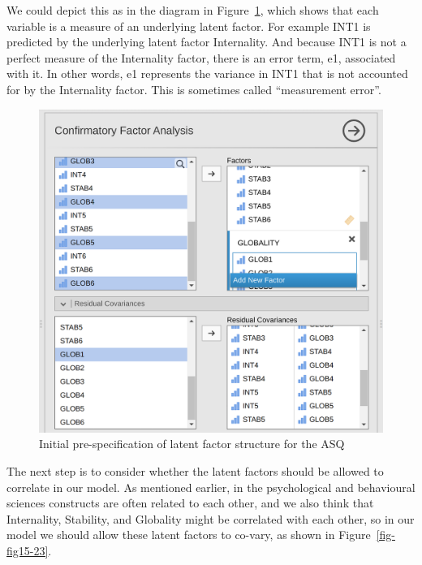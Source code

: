 \documentclass[
  a4paper,
]{book}
\begin{document}
We could depict this as in the diagram in Figure~\ref{fig-fig15-22},
which shows that each variable is a measure of an underlying latent
factor. For example INT1 is predicted by the underlying latent factor
Internality. And because INT1 is not a perfect measure of the
Internality factor, there is an error term, e1, associated with it. In
other words, e1 represents the variance in INT1 that is not accounted
for by the Internality factor. This is sometimes called ``measurement
error''.

\begin{figure}

\includegraphics[width=1\textwidth,height=\textheight]{images/fig15-22.png} \hfill{}

\caption{\label{fig-fig15-22}Initial pre-specification of latent factor
structure for the ASQ}

\end{figure}

The next step is to consider whether the latent factors should be
allowed to correlate in our model. As mentioned earlier, in the
psychological and behavioural sciences constructs are often related to
each other, and we also think that Internality, Stability, and Globality
might be correlated with each other, so in our model we should allow
these latent factors to co-vary, as shown in Figure~\ref{fig-fig15-23}.
\end{document}
